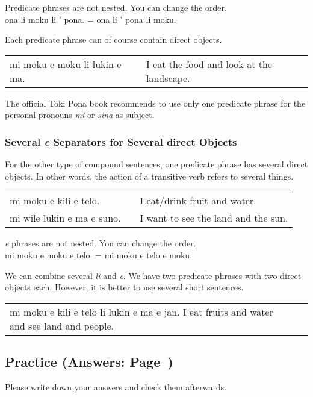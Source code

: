 Predicate phrases are not nested. You can change the order. \\
ona li moku li ' pona. = ona li ' pona li moku. 

Each predicate phrase can of course contain direct objects. 

\begin{supertabular}{p{5,5cm}|ll}
mi moku e moku li lukin e ma. && I eat the food and look at the landscape. \\
\end{supertabular} 

The official Toki Pona book recommends to use only one predicate phrase for the personal pronouns \textit{mi} or \textit{sina} as subject. 
%
\label{'multiple_e'}
\subsubsection*{Several \textit{e} Separators for Several direct Objects}
%
For the other type of compound sentences, one predicate phrase has several direct objects. 
In other words, the action of a transitive verb refers to several things. 

\begin{supertabular}{p{5,5cm}|ll}
mi moku e kili e telo. && I eat/drink fruit and water. \\
mi wile lukin e ma e suno. && I want to see the land and the sun. \\
\end{supertabular}
 
\textit{e} phrases are not nested. You can change the order. \\
mi moku e moku e telo. = mi moku e telo e moku. 

We can combine several \textit{li} and \textit{e}.
We have two predicate phrases with two direct objects each. 
However, it is better to use several short sentences. 

\begin{supertabular}{p{5,5cm}|ll}
mi moku e kili e telo li lukin e ma e jan. I eat fruits and water and see land and people. \\
\end{supertabular} 

%
\newpage
\subsection*{Practice (Answers: Page~\pageref{'direct_objects_compund_sentences'})}
%
Please write down your answers and check them afterwards. 

